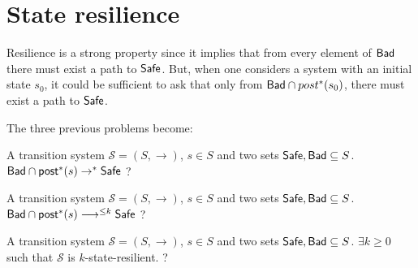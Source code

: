 



\section{State resilience}


Resilience is a strong property since it implies that from every element of $\textsf{Bad}$ there must exist a path to $\textsf{Safe}$. But, when one considers a system with an initial state $s_0$, it could be sufficient to ask that only from $\textsf{Bad} \cap post^*(s_0)$, there must exist a path to $\textsf{Safe}$. 
%
%
%


The three previous problems become:


{A transition system $\mathscr{S}=(S,\rightarrow)$, $s \in S$ and two sets $\textsf{Safe}, \textsf{Bad} \subseteq S$.}
{$\textsf{Bad} \cap \textsf{post}^*(s)  \rightarrow^{*} \textsf{Safe} $ ? \newline}


{A transition system $\mathscr{S}=(S,\rightarrow)$, $s \in S$ and two sets $\textsf{Safe}, \textsf{Bad} \subseteq S$.}
{ $\textsf{Bad} \cap \textsf{post}^*(s) \longrightarrow^{\leq k} \textsf{Safe}$ ?  \newline}
%

{A transition system $\mathscr{S}=(S,\rightarrow)$, $s \in S$ and two sets $\textsf{Safe}, \textsf{Bad} \subseteq S$.}
{$\exists k \geq 0$ such that $\mathscr{S}$ is $k$-state-resilient. ?\newline}


